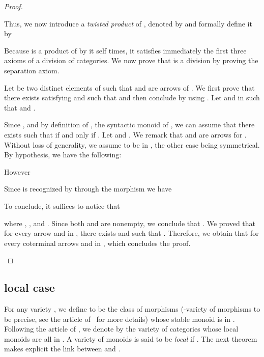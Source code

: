 \documentclass[submission,hidelink]{dmtcs-episciences}
\newenvironment{conditions}
{\begin{list}{\rm (\theenumi)}{\noindent \usecounter{enumi}\setlength{\topsep}{2pt}\setlength{\partopsep}{0pt}\setlength{\itemsep}{2pt}\setlength{\parsep}{0pt}\setlength{\leftmargin}{2.5em}\setlength{\labelwidth}{1.5em}\setlength{\labelsep}{0.5em}\setlength{\listparindent}{0pt}\setlength{\itemindent}{0pt}}}{\end{list}}
\begin{document}
\begin{proof}
\begin{conditions}
					Thus, we now introduce a \emph{twisted product} of , denoted by 
					and formally define it by
					
					Because  is a product of  by it self  times, it satisfies immediately the
					first
					three axioms of a division of categories. We now prove that  is a division by proving the separation axiom.
					\begin{conditions}
						\setcounter{enumi}{3}
						\item Let  be two distinct elements of  such that
						 and  are arrows of . We first
						prove that there exists  satisfying 
						and such that 
						and then conclude by using .
						Let  and  in  such that  and .

						Since , and by definition of , the syntactic monoid of ,
						we can assume that there exists  such that 
						if and only if .
						Let  and .
						We remark that  and  are
						arrows   for .
						Without loss of generality, we assume  to be in , the other case being symmetrical.
						By hypothesis, we have the following:
						
						However
						

						Since  is recognized by  through the morphism  we have
						
						To conclude, it suffices to notice that
						
						where , ,  and . Since both  and
						 are nonempty, we conclude that .
						We proved that for every arrow  and  in , there exists
						  and such that .
						Therefore, we obtain that  
						for every coterminal arrows  and  in , which concludes the proof.

					\end{conditions}



			\end{conditions}
		\end{proof}


\subsection{local case}\label{Subsection:Local}

	For any variety , we define  to be the class of morphisms (-variety of morphisms to be precise,
	see the article of~\cite{PS05} for more details) whose stable
	monoid is in .
	Following the article of \cite{Tilson}, we denote by
	 the variety of categories whose local monoids are all in .
	A variety of monoids  is said to be \emph{local} if .
	The next theorem makes explicit the link between  and .
\end{document}
